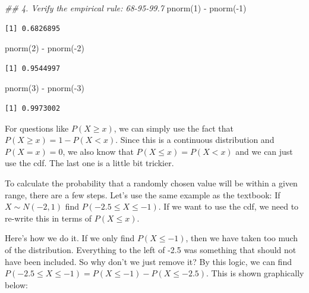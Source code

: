 \documentclass[
  letterpaper,
  DIV=11,
  numbers=noendperiod,
  oneside]{scrreprt}
\newenvironment{Shaded}{\begin{snugshade}}{\end{snugshade}}
\newcommand{\DecValTok}[1]{\textcolor[rgb]{0.68,0.00,0.00}{#1}}
\newcommand{\DocumentationTok}[1]{\textcolor[rgb]{0.37,0.37,0.37}{\textit{#1}}}
\newcommand{\FunctionTok}[1]{\textcolor[rgb]{0.28,0.35,0.67}{#1}}
\newcommand{\NormalTok}[1]{\textcolor[rgb]{0.00,0.23,0.31}{#1}}
\newcommand{\SpecialCharTok}[1]{\textcolor[rgb]{0.37,0.37,0.37}{#1}}
\begin{document}
\begin{Shaded}
\begin{Highlighting}[]
\DocumentationTok{\#\# 4. Verify the empirical rule: 68{-}95{-}99.7}
\FunctionTok{pnorm}\NormalTok{(}\DecValTok{1}\NormalTok{) }\SpecialCharTok{{-}} \FunctionTok{pnorm}\NormalTok{(}\SpecialCharTok{{-}}\DecValTok{1}\NormalTok{)}
\end{Highlighting}
\end{Shaded}

\begin{verbatim}
[1] 0.6826895
\end{verbatim}

\begin{Shaded}
\begin{Highlighting}[]
\FunctionTok{pnorm}\NormalTok{(}\DecValTok{2}\NormalTok{) }\SpecialCharTok{{-}} \FunctionTok{pnorm}\NormalTok{(}\SpecialCharTok{{-}}\DecValTok{2}\NormalTok{)}
\end{Highlighting}
\end{Shaded}

\begin{verbatim}
[1] 0.9544997
\end{verbatim}

\begin{Shaded}
\begin{Highlighting}[]
\FunctionTok{pnorm}\NormalTok{(}\DecValTok{3}\NormalTok{) }\SpecialCharTok{{-}} \FunctionTok{pnorm}\NormalTok{(}\SpecialCharTok{{-}}\DecValTok{3}\NormalTok{)}
\end{Highlighting}
\end{Shaded}

\begin{verbatim}
[1] 0.9973002
\end{verbatim}

For questions like \(P(X\ge x)\), we can simply use the fact that
\(P(X \ge x) = 1 - P(X<x)\). Since this is a continuous distribution and
\(P(X = x)=0\), we also know that \(P(X\le x) = P(X<x)\) and we can just
use the cdf. The last one is a little bit trickier.

To calculate the probability that a randomly chosen value will be within
a given range, there are a few steps. Let's use the same example as the
textbook: If \(X\sim N(-2, 1)\) find \(P(-2.5\le X\le -1)\). If we want
to use the cdf, we need to re-write this in terms of \(P(X\le x)\).

Here's how we do it. If we only find \(P(X\le-1)\), then we have taken
too much of the distribution. Everything to the left of -2.5 was
something that should not have been included. So why don't we just
remove it? By this logic, we can find
\(P(-2.5\le X \le -1) = P(X\le -1) - P(X \le -2.5)\). This is shown
graphically below:
\end{document}
